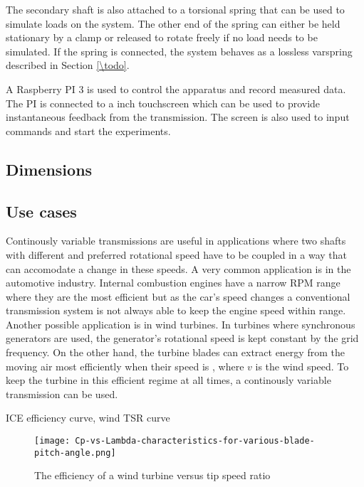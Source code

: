 \documentclass[12pt]{article}
\begin{document}
The secondary shaft is also attached to a torsional spring that can be used to simulate loads on the system. The other end of the spring can either be held stationary by a clamp or released to rotate freely if no load needs to be simulated. If the spring is connected, the system behaves as a lossless varspring described in Section \ref{\todo}.

A Raspberry PI 3 is used to control the apparatus and record measured data. The PI is connected to a \todo inch touchscreen which can be used to provide instantaneous feedback from the transmission. The screen is also used to input commands and start the experiments. 




\subsection{Dimensions}

\subsection{Use cases}
Continously variable transmissions are useful in applications where two shafts with different and preferred rotational speed have to be coupled in a way that can accomodate a change in these speeds.
A very common application is in the automotive industry. Internal combustion engines have a narrow RPM range where they are the most efficient but as the car's speed changes a conventional transmission system is not always able to keep the engine speed within range.
Another possible application is in wind turbines. In turbines where synchronous generators are used, the generator's rotational speed is kept constant by the grid frequency. On the other hand, the turbine blades can extract energy from the moving air most efficiently when their speed is \todo, where $v$ is the wind speed. To keep the turbine in this efficient regime at all times, a continously variable transmission can be used.

\todo ICE efficiency curve, wind TSR curve
\begin{figure}
    \centering
    \texttt{[image: Cp-vs-Lambda-characteristics-for-various-blade-pitch-angle.png]}
    \caption{The efficiency of a wind turbine versus tip speed ratio}
    \label{fig:enter-label}
\end{figure}
\end{document}
